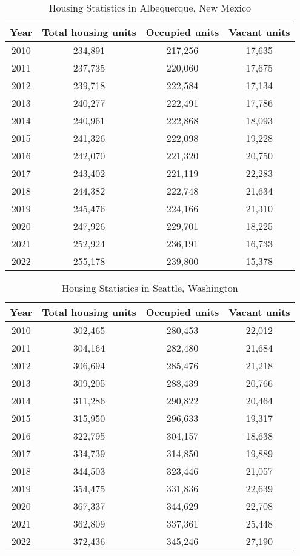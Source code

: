 \documentclass[12pt]{article}
\begin{document}
\begin{table}[H]
  \centering
  \begin{tabular}{|c c c c|} 
    \hline 
    Year & Total housing units & Occupied units & Vacant units \\ [0.5ex]
    \hline
    2010  &  234,891 & 217,256 & 17,635 \\
    2011  &  237,735 & 220,060 & 17,675 \\
    2012  &  239,718 & 222,584 & 17,134 \\
    2013  &  240,277 & 222,491 & 17,786 \\
    2014  &  240,961 & 222,868 & 18,093 \\
    2015  &  241,326 & 222,098 & 19,228 \\
    2016  &  242,070 & 221,320 & 20,750 \\
    2017  &  243,402 & 221,119 & 22,283 \\
    2018  &  244,382 & 222,748 & 21,634 \\
    2019  &  245,476 & 224,166 & 21,310 \\
    2020  &  247,926 & 229,701 & 18,225 \\
    2021  &  252,924 & 236,191 & 16,733 \\
    2022  &  255,178 & 239,800 & 15,378 \\ [1ex] 
    \hline
  \end{tabular}
  \caption{Housing Statistics in Albequerque, New Mexico \cite{Census2010ACSDP1Y2010.DP04}}
\end{table}

\begin{table}[H]
  \centering
  \begin{tabular}{|c c c c|}
    \hline
    Year & Total housing units & Occupied units & Vacant units \\ [0.5ex]
    \hline
    2010 & 302,465 & 280,453 & 22,012 \\
    2011 & 304,164 & 282,480 & 21,684 \\
    2012 & 306,694 & 285,476 & 21,218 \\
    2013 & 309,205 & 288,439 & 20,766 \\
    2014 & 311,286 & 290,822 & 20,464 \\
    2015 & 315,950 & 296,633 & 19,317 \\
    2016 & 322,795 & 304,157 & 18,638 \\
    2017 & 334,739 & 314,850 & 19,889 \\
    2018 & 344,503 & 323,446 & 21,057 \\
    2019 & 354,475 & 331,836 & 22,639 \\
    2020 & 367,337 & 344,629 & 22,708 \\
    2021 & 362,809 & 337,361 & 25,448 \\
    2022 & 372,436 & 345,246 & 27,190 \\ [1ex]
    \hline
  \end{tabular}
  \caption{Housing Statistics in Seattle, Washington \cite{Census2010ACSDP5Y2010.DP04}}
\end{table}
\end{document}
